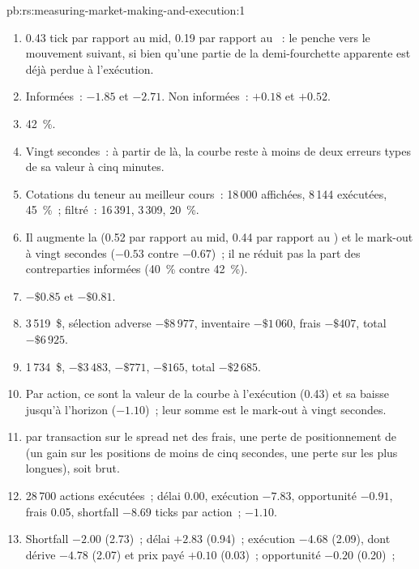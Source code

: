 \begin{solution}{pb:rs:measuring-market-making-and-execution:1}
\begin{enumerate}
\item 0.43 tick par rapport au mid, 0.19 par rapport au ~: le  penche vers le mouvement suivant, si bien qu'une partie de la demi-fourchette apparente est
déjà perdue à l'exécution.
\item Informées~: $-1.85$ et $-2.71$. Non informées~: $+0.18$ et $+0.52$.
\item 42~\%.
\item Vingt secondes~: à partir de là, la courbe reste à moins de deux erreurs types de sa valeur à cinq minutes.
\item Cotations du teneur au meilleur cours~: 18\,000 affichées, 8\,144 exécutées, 45~\%~; filtré~: 16\,391, 3\,309, 20~\%.
\item Il augmente la  (0.52 par rapport au mid, 0.44 par rapport au ) et le mark-out à vingt secondes ($-0.53$ contre $-0.67$)~;
il ne réduit pas la part des contreparties informées (40~\% contre 42~\%).
\item $-\$0.85$ et $-\$0.81$.
\item {} 3\,519~\$, sélection adverse $-\$8\,977$, inventaire $-\$1\,060$, frais $-\$407$, total $-\$6\,925$.
\item 1\,734~\$, $-\$3\,483$, $-\$771$, $-\$165$, total $-\$2\,685$.
\item Par action, ce sont la valeur de la courbe à l'exécution (0.43) et sa baisse jusqu'à l'horizon ($-1.10$)~; leur somme est le mark-out à vingt secondes.
\item {} par transaction sur le spread net des frais, une perte de positionnement de  (un gain sur les positions de moins de cinq secondes, une perte sur
les plus longues), soit  brut.
\item 28\,700 actions exécutées~; délai 0.00, exécution $-7.83$, opportunité $-0.91$, frais 0.05, shortfall $-8.69$ ticks par action~;  $-1.10$.
\item Shortfall $-2.00$ (2.73)~; délai $+2.83$ (0.94)~; exécution $-4.68$ (2.09), dont dérive $-4.78$ (2.07) et prix payé $+0.10$ (0.03)~; opportunité $-0.20$ (0.20)~;

\end{enumerate}
\end{solution}
